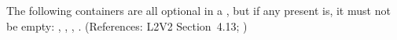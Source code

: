 The following containers are all optional in a \Reaction, but if any
present is, it must not be empty: ,
, , .
(References: L2V2 Section~4.13; )
